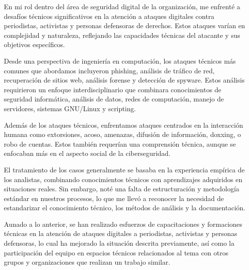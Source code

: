 \documentclass[12pt]{caltech_thesis}
\begin{document}
En mi rol dentro del área de seguridad digital de la organización, me enfrenté a desafíos técnicos significativos en la atención a ataques digitales contra periodistas, activistas y personas defensoras de derechos. Estos ataques varían en complejidad y naturaleza, reflejando las capacidades técnicas del atacante y sus objetivos específicos.

Desde una perspectiva de ingeniería en computación, los ataques técnicos más comunes que abordamos incluyeron phishing, análisis de tráfico de red, recuperación de sitios web, análisis forense y detección de spyware. Estos análisis requirieron un enfoque interdisciplinario que combinara conocimientos de seguridad informática, análisis de datos, redes de computación, manejo de servidores, sistemas GNU/Linux y scripting.

Además de los ataques técnicos, enfrentamos ataques centrados en la interacción humana como extorsiones, acoso, amenazas, difusión de información, doxxing, o robo de cuentas. Estos también requerían una comprensión técnica, aunque se enfocaban más en el aspecto social de la ciberseguridad.

El tratamiento de los casos generalmente se basaba en la experiencia empírica de los analistas, combinando conocimientos técnicos con aprendizajes adquiridos en situaciones reales. Sin embargo, noté una falta de estructuración y metodología estándar en nuestros procesos, lo que me llevó a reconocer la necesidad de estandarizar el conocimiento técnico, los métodos de análisis y la documentación.

Aunado a lo anterior, se han realizado esfuerzos de capacitaciones y formaciones técnicas en la atención de ataques digitales a periodistas, activistas y personas defensoras, lo cual ha mejorado la situación descrita previamente, así como la participación del equipo en espacios técnicos relacionados al tema con otros grupos y organizaciones que realizan un trabajo similar.


\end{document}
